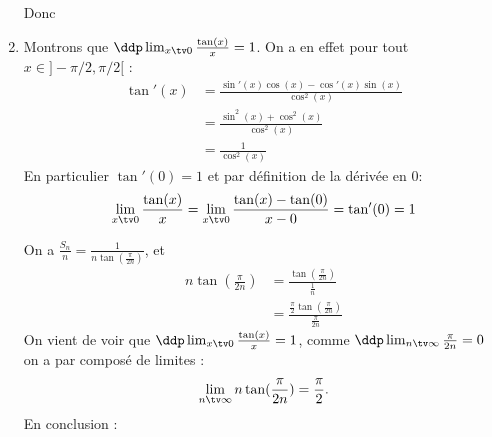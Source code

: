 \documentclass[a4paper, 11pt,reqno]{article}
\begin{document}
\begin{correction}
\begin{enumerate}
Donc 
\begin{center}
\end{center}

\item Montrons que $\ddp\lim_{x\tv 0} \frac{\tan(x)}{x}=1$. 
On a en effet pour tout $x\in ]-\pi/2, \pi/2[$  :
\begin{align*}
\tan'(x) &=\frac{\sin'(x)\cos(x)-\cos'(x)\sin(x)}{\cos^2(x)}\\
			&=\frac{\sin^2(x)+\cos^2(x)}{\cos^2(x)}\\
			&=\frac{1}{\cos^2(x)}			
\end{align*}
En particulier $\tan'(0)=1$ et par définition  de la dérivée en $0$: 
$$\lim_{x\tv 0} \frac{\tan(x)}{x}=\lim_{x\tv 0} \frac{\tan(x)-\tan(0)}{x-0}=\tan'(0)=1$$

On a  $\frac{S_n}{n}= \frac{1}{n \tan(\frac{\pi}{2n})}$, et 
\begin{align*}
n \tan(\frac{\pi}{2n}) &= \frac{ \tan(\frac{\pi}{2n}) }{\frac{1}{n}}\\
								&= \frac{ \frac{\pi}{2}\tan(\frac{\pi}{2n}) }{\frac{\pi}{2n}}
\end{align*}
On vient de voir que $\ddp\lim_{x\tv 0} \frac{\tan(x)}{x}=1$, comme $\ddp \lim_{n\tv \infty} \frac{\pi}{2n}=0$ on a par composé de limites : 
$$\lim_{n\tv \infty} n \tan(\frac{\pi}{2n})  =\frac{\pi}{2}.$$
En conclusion : 
\begin{center}
\end{center}
\end{enumerate}
\end{correction}
\end{document}
